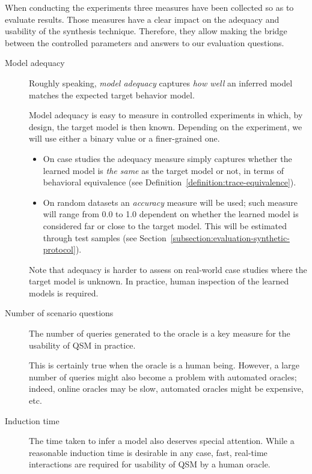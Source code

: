 When conducting the experiments three measures have been collected so as to evaluate results. Those measures have a clear impact on the adequacy and usability of the synthesis technique. Therefore, they allow making the bridge between the controlled parameters and answers to our evaluation questions.
\begin{description}
\item[Model adequacy] Roughly speaking, \emph{model adequacy} captures \emph{how well} an inferred model matches the expected target behavior model. 

Model adequacy is easy to measure in controlled experiments in which, by design, the target model is then known. Depending on the experiment, we will use either a binary value or a finer-grained one.
\begin{itemize}
\item On case studies the adequacy measure simply captures whether the learned model is \emph{the same} as the target model or not, in terms of behavioral equivalence (see Definition~\ref{definition:trace-equivalence}).
\item On random datasets an \emph{accuracy} measure will be used; such measure will range from 0.0 to 1.0 dependent on whether the learned model is considered far or close to the target model. This will be estimated through test samples (see Section~\ref{subsection:evaluation-synthetic-protocol}).
\end{itemize}
Note that adequacy is harder to assess on real-world case studies where the target model is unknown. In practice, human inspection of the learned models is required.

\item[Number of scenario questions] The number of queries generated to the oracle is a key measure for the usability of QSM in practice. 

This is certainly true when the oracle is a human being. However, a large number of queries might also become a problem with automated oracles; indeed, online oracles may be slow, automated oracles might be expensive, etc.

\item[Induction time] The time taken to infer a model also deserves special attention. While a reasonable induction time is desirable in any case, fast, real-time interactions are required for usability of QSM by a human oracle.
\end{description}

